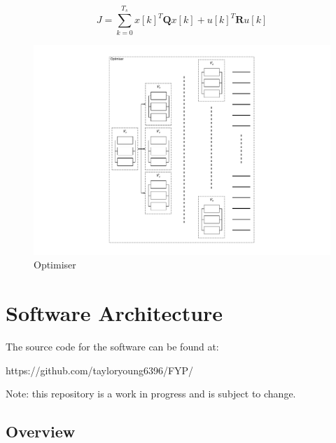 \documentclass[11pt,a4paper]{article}
\begin{document}
\begin{equation}
    J = \sum_{k=0}^{T_s} x\left[k\right]^T\textbf{Q}x\left[k\right] + u\left[k\right]^T\textbf{R}u\left[k\right]
    \label{math:cost_function}
\end{equation}

\begin{figure}[!hbt]
    \centering
    \includegraphics[clip, trim=5cm 1cm 5cm 1cm, width=1.00\textwidth]{BlockDiagram_Optimiser.pdf}
    \caption{Optimiser}
    \label{fig:control_diagram_optimiser}
\end{figure}

\clearpage
\section{Software Architecture}
\label{sub:software}

The source code for the software can be found at:
\begin{center}
https://github.com/tayloryoung6396/FYP/    
\end{center}
Note: this repository is a work in progress and is subject to change.

\subsection{Overview}
\label{sub:software_overview}
\end{document}
